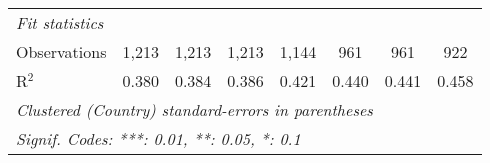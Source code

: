 \begin{tabular}{lccccccc}
   \midrule \emph{Fit statistics}\\
   Observations                                                         & 1,213       & 1,213       & 1,213        & 1,144          & 961            & 961            & 922\\  
   R$^2$                                                                & 0.380       & 0.384       & 0.386        & 0.421          & 0.440          & 0.441          & 0.458\\  
   \midrule
   \multicolumn{8}{l}{\emph{Clustered (Country) standard-errors in parentheses}}\\
   \multicolumn{8}{l}{\emph{Signif. Codes: ***: 0.01, **: 0.05, *: 0.1}}\\
\end{tabular}
\par\endgroup


